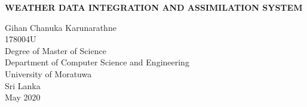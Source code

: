 \documentclass[a4paper,oneside,12pt]{report}
\begin{document}
\begin{titlepage}
    \begin{center}
        \Large{
        \textbf{WEATHER DATA INTEGRATION AND ASSIMILATION SYSTEM}}\\
        \vspace{144pt}
  \large      
       
        
        
        Gihan Chanuka Karunarathne\\
        \vspace{24pt}
      178004U\\
         \vspace{72pt}
        Degree of Master of Science\\
       
        
       \vspace{72pt}
        \large
        Department of Computer Science and Engineering\\
        \vspace{24pt}
        University of Moratuwa\\
        Sri Lanka\\
        \vspace{32pt}
        May 2020
        
    \end{center}
\end{titlepage}
\end{document}
